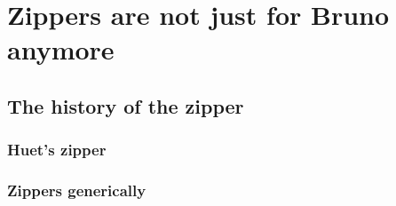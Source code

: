 \section{Zippers are not just for Bruno anymore}

\subsection{The history of the zipper}

\subsubsection{Huet's zipper}

\subsubsection{Zippers generically}

